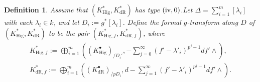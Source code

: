\documentclass[12pt, a4paper]{article}
\newtheorem{definition}{Definition}[section]
\begin{document}
\begin{definition}
Assume that $(K^*_{\mathrm{Hig}},K^*_{\mathrm{dR}})$ has type $(\mathrm{\uppercase\expandafter{\romannumeral4}},0)$.Let $\Delta=\sum_{i=1}^m[\lambda_i]$ with each $\lambda_i\in k$, and let
$D_i:=g^*[\lambda_i]$.
Define the formal $g$-transform along $D$ of  $(K^*_{\mathrm{Hig}},K^*_{\mathrm{dR}})$ to be the pair $(K^*_{\mathrm{Hig},f},K^*_{\mathrm{dR},f})$, where
$$
\begin{array}{c}
K^*_{\mathrm{Hig},f}:=\bigoplus_{i=1}^m((K^\bullet_{\mathrm{Hig}})_{/D_i'},-\sum_{j=0}^\infty(f'-\lambda'_i)^{p^j-1}df'\wedge),\\
K^*_{\mathrm{dR},f}:=\bigoplus_{i=1}^m((K^\bullet_{\mathrm{dR}})_{/pD_i},d-\sum_{j=1}^\infty(f'-\lambda'_i)^{p^j-1}df'\wedge).
\end{array}
$$

\end{definition}
\end{document}
